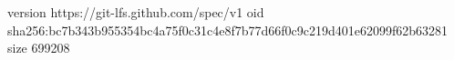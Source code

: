 version https://git-lfs.github.com/spec/v1
oid sha256:bc7b343b955354bc4a75f0c31c4e8f7b77d66f0c9c219d401e62099f62b63281
size 699208
